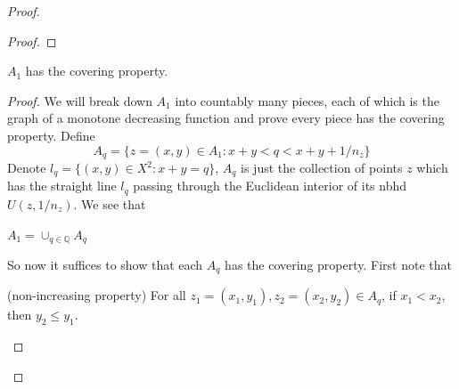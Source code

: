 \documentclass[10pt,a4paper]{amsart}
\DeclareMathOperator{\interior}{int}
\newcommand{\Q}{\mathbb{Q}}
\begin{document}
\begin{proof}
\begin{proof}
    \end{proof}
    \begin{claim}\label{clm:A1_cov}
        $A_1$ has the covering property.
    \end{claim}
    \begin{proof}  We will break down $A_1$ into countably many pieces, each of which is the graph of a monotone decreasing function and prove every piece has the covering property. Define
    \[A_q=\{ z=(x,y)\in A_1:x+y<q<x+y+1/n_z \}\]
    Denote $l_q= \{(x,y)\in X^2: x+y=q\}$, $A_q$ is just the collection of points $z$ which has the straight line $l_q$ passing through the Euclidean interior of its nbhd $U(z,1/n_z)$. We see that 
    \begin{simplebox}
        \begin{observation}
            $A_1= \cup_{q\in \Q}A_q$
        \end{observation}
    \end{simplebox} So now it suffices to show that each $A_q$ has the covering property. First note that 
    \begin{claim}(non-increasing property)\label{clm:diagonal}
    For all $z_1=(x_1,y_1),z_2=(x_2,y_2)\in A_q$, if $x_1< x_2$, then $y_2\leq y_1$. 


\end{claim}
\end{proof}
\end{proof}
\end{document}
